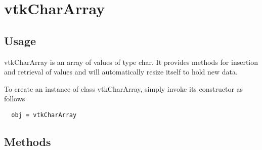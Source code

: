 \section{vtkCharArray}

\subsection{Usage}

 vtkCharArray is an array of values of type char.  It provides
 methods for insertion and retrieval of values and will
 automatically resize itself to hold new data.

To create an instance of class vtkCharArray, simply
invoke its constructor as follows
\begin{verbatim}
  obj = vtkCharArray
\end{verbatim}
\subsection{Methods}

